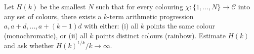 Let $H(k)$ be the smallest $N$ such that for every colouring $\chi:\{1,\dots,N\}\to\mathcal{C}$ into any set of colours,
there exists a $k$-term arithmetic progression $a,a+d,\dots,a+(k-1)d$ with either:
(i) all $k$ points the same colour (monochromatic), or
(ii) all $k$ points distinct colours (rainbow).
Estimate $H(k)$ and ask whether $H(k)^{1/k}/k\to\infty$.
